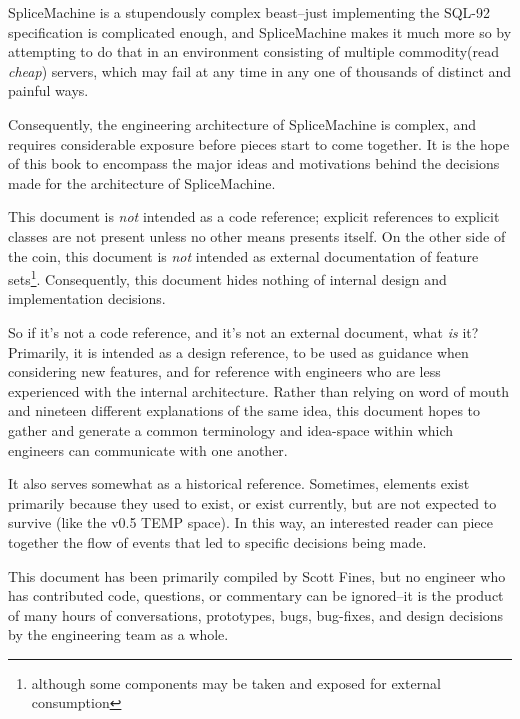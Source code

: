 SpliceMachine is a stupendously complex beast--just implementing the SQL-92 specification is complicated enough, and SpliceMachine makes it much more so by attempting to do that in an environment consisting of multiple commodity(read \emph{cheap}) servers, which may fail at any time in any one of thousands of distinct and painful ways. 

Consequently, the engineering architecture of SpliceMachine is complex, and requires considerable exposure before pieces start to come together. It is the hope of this book to encompass the major ideas and motivations behind the decisions made for the architecture of SpliceMachine. 

This document is \emph{not} intended as a code reference; explicit references to explicit classes are not present unless no other means presents itself. On the other side of the coin, this document is \emph{not} intended as external documentation of feature sets\footnote{although some components may be taken and exposed for external consumption}. Consequently, this document hides nothing of internal design and implementation decisions.

So if it's not a code reference, and it's not an external document, what \emph{is} it? Primarily, it is intended as a design reference, to be used as guidance when considering new features, and for reference with engineers who are less experienced with the internal architecture. Rather than relying on word of mouth and nineteen different explanations of the same idea, this document hopes to gather and generate a common terminology and idea-space within which engineers can communicate with one another.

It also serves somewhat as a historical reference. Sometimes, elements exist primarily because they used to exist, or exist currently, but are not expected to survive (like the v0.5 TEMP space). In this way, an interested reader can piece together the flow of events that led to specific decisions being made.

This document has been primarily compiled by Scott Fines, but no engineer who has contributed code, questions, or commentary can be ignored--it is the product of many hours of conversations, prototypes, bugs, bug-fixes, and design decisions by the engineering team as a whole. 
